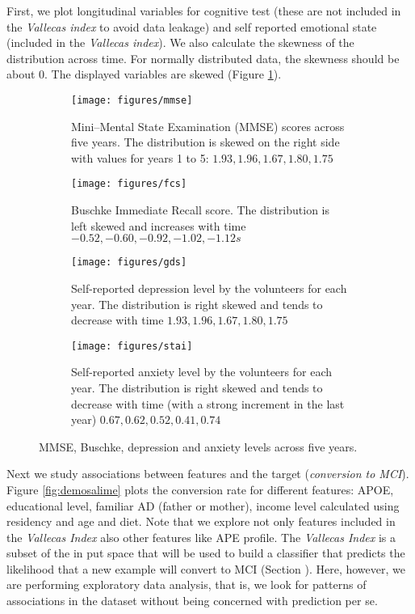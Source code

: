 \documentclass[11pt]{article}
\begin{document}
First, we plot longitudinal variables for cognitive test (these are not included in the \emph{Vallecas index} to avoid data leakage) and self reported emotional state (included in the \emph{Vallecas index}). We also calculate the skewness of the distribution across time. For normally distributed data, the skewness should be about 0. The displayed variables are skewed (Figure \ref{fig:staigds}). 

\begin{figure}[H]
    \centering
    \begin{subfigure}[t]{\textwidth}
        \centering
        \texttt{[image: figures/mmse]}
        \caption{Mini–Mental State Examination (MMSE) scores across five years. The distribution is skewed on the right side with values for years 1 to 5: $1.93, 1.96, 1.67, 1.80, 1.75$}
    \end{subfigure}
    
    \begin{subfigure}[t]{\textwidth}
        \centering
        \texttt{[image: figures/fcs]}
        \caption{Buschke Immediate Recall score. The distribution is left skewed and increases with time $-0.52, -0.60, -0.92, -1.02, -1.12s$ }
    \end{subfigure}%
    
     \begin{subfigure}[t]{\textwidth}
        \centering
        \texttt{[image: figures/gds]}
        \caption{Self-reported depression level by the volunteers for each year. The distribution is right skewed and tends to decrease with time $1.93, 1.96, 1.67, 1.80, 1.75$ }
    \end{subfigure}
    
    \begin{subfigure}[t]{\textwidth}
        \centering
        \texttt{[image: figures/stai]}
        \caption{Self-reported anxiety level by the volunteers for each year. The distribution is right skewed and tends to decrease with time (with a strong increment in the last year) $0.67, 0.62, 0.52, 0.41, 0.74$}
    \end{subfigure}%
    \label{fig:staigds}
    \caption{MMSE, Buschke, depression and anxiety levels across five years.}
\end{figure}

Next we study associations between features and the target (\emph{conversion to MCI}). 
Figure \ref{fig:demosalime} plots the conversion rate for different features: APOE, educational level, familiar AD (father or mother), income level calculated using residency and age and diet. Note that we explore not only features included in the \emph{Vallecas Index} also other features like APE profile. The \emph{Vallecas Index} is a subset of the in put space that will be used to build a classifier that predicts the likelihood that a new example will convert to MCI (Section ). Here, however, we are performing exploratory data analysis, that is, we look for patterns of associations in the dataset without being concerned with prediction per se.
\end{document}
